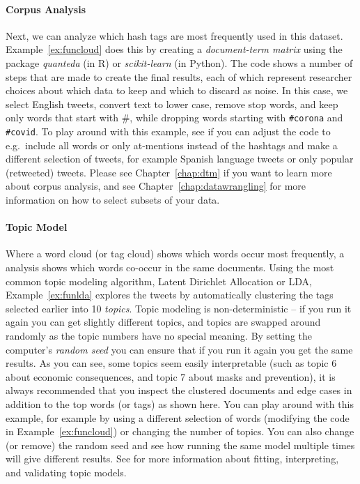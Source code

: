 \paragraph{Corpus Analysis} Next, we can analyze which hash tags are most frequently used in this dataset.
Example~\ref{ex:funcloud} does this by creating a \emph{document-term matrix} using the package \emph{quanteda} (in R)
or \emph{scikit-learn} (in Python).
The code shows a number of steps that are made to create the final results, each of which represent
researcher choices about which data to keep and which to discard as noise.
In this case,  we select English tweets, convert text to lower case,  remove stop words, and keep only words that start with \#,
while dropping words starting with \verb+#corona+ and \verb+#covid+.
To play around with this example,
see if you can adjust the code to e.g.\ include all words or only at-mentions instead of the hashtags
and make a different selection of tweets, for example Spanish language tweets or only popular (retweeted) tweets.
Please see Chapter~\ref{chap:dtm} if you want to learn more about corpus analysis,
and see Chapter~\ref{chap:datawrangling} for more information on how to select subsets of your data.


\paragraph{Topic Model}
Where a word cloud (or tag cloud) shows which words occur most frequently,
a  analysis shows which words co-occur in the same documents.
Using the most common topic modeling algorithm, Latent Dirichlet Allocation or LDA,
Example~\ref{ex:funlda} explores the tweets by automatically clustering the tags selected earlier into 10 \emph{topics}.
Topic modeling is non-deterministic -- if you run it again you can get slightly different topics,
and topics are swapped around randomly as the topic numbers have no special meaning.
By setting the computer's \emph{random seed} you can ensure that if you run it again you get the same results.
As you can see, some topics seem easily interpretable (such as topic 6 about economic consequences,
and topic 7 about masks and prevention), it is always recommended that you inspect the clustered documents
and edge cases in addition to the top words (or tags) as shown here.
You can play around with this example, for example by using a different selection of words
(modifying the code in Example~\ref{ex:funcloud}) or changing the number of topics.
You can also change (or remove) the random seed and see how running the same model multiple times will give different results. 
See  for more information about fitting, interpreting, and validating topic models.

